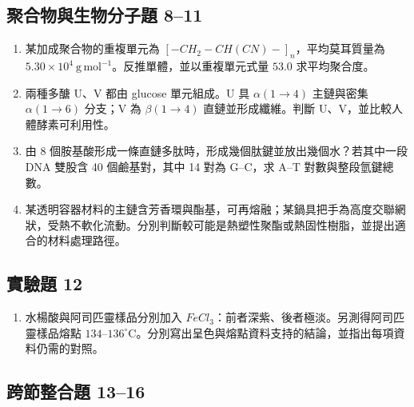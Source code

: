 \documentclass[11pt,a4paper]{article}
\providecommand{\tightlist}{%
  \setlength{\itemsep}{0pt}\setlength{\parskip}{0pt}}
\begin{document}
\subsection{聚合物與生物分子題 8--11}\label{ux805aux5408ux7269ux8207ux751fux7269ux5206ux5b50ux984c-811}

\begin{enumerate}
\def\labelenumi{\arabic{enumi}.}
\setcounter{enumi}{7}
\tightlist
\item
  某加成聚合物的重複單元為 \([-CH_2-CH(CN)-]_n\)，平均莫耳質量為 \(5.30\times10^4\ \mathrm{g\,mol^{-1}}\)。反推單體，並以重複單元式量 \(53.0\) 求平均聚合度。
\item
  兩種多醣 U、V 都由 glucose 單元組成。U 具 \(\alpha(1\rightarrow4)\) 主鏈與密集 \(\alpha(1\rightarrow6)\) 分支；V 為 \(\beta(1\rightarrow4)\) 直鏈並形成纖維。判斷 U、V，並比較人體酵素可利用性。
\item
  由 8 個胺基酸形成一條直鏈多肽時，形成幾個肽鍵並放出幾個水？若其中一段 DNA 雙股含 40 個鹼基對，其中 14 對為 G--C，求 A--T 對數與整段氫鍵總數。
\item
  某透明容器材料的主鏈含芳香環與酯基，可再熔融；某鍋具把手為高度交聯網狀，受熱不軟化流動。分別判斷較可能是熱塑性聚酯或熱固性樹脂，並提出適合的材料處理路徑。
\end{enumerate}

\subsection{實驗題 12}\label{ux5be6ux9a57ux984c-12}

\begin{enumerate}
\def\labelenumi{\arabic{enumi}.}
\setcounter{enumi}{11}
\tightlist
\item
  水楊酸與阿司匹靈樣品分別加入 \(FeCl_3\)：前者深紫、後者極淡。另測得阿司匹靈樣品熔點 \(134\)--\(136^\circ\mathrm C\)。分別寫出呈色與熔點資料支持的結論，並指出每項資料仍需的對照。
\end{enumerate}

\subsection{跨節整合題 13--16}\label{ux8de8ux7bc0ux6574ux5408ux984c-1316}
\end{document}
